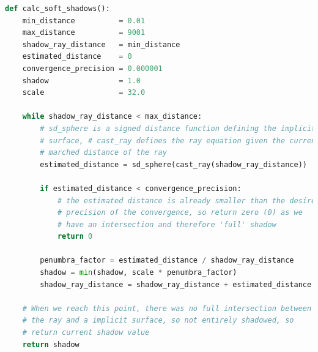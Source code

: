 \begin{lstlisting}[language=Python,caption={Algorithmus zur Berechnung
        von weichen Schatten.},label={alg:sphere_tracing_soft_shadows},captionpos=b,emph={calc_soft_shadows}]
def calc_soft_shadows():
    min_distance          = 0.01
    max_distance          = 9001
    shadow_ray_distance   = min_distance
    estimated_distance    = 0
    convergence_precision = 0.000001
    shadow                = 1.0
    scale                 = 32.0

    while shadow_ray_distance < max_distance:
        # sd_sphere is a signed distance function defining the implicit
        # surface, # cast_ray defines the ray equation given the current travelled /
        # marched distance of the ray
        estimated_distance = sd_sphere(cast_ray(shadow_ray_distance))

        if estimated_distance < convergence_precision:
            # the estimated distance is already smaller than the desired
            # precision of the convergence, so return zero (0) as we
            # have an intersection and therefore 'full' shadow
            return 0

        penumbra_factor = estimated_distance / shadow_ray_distance
        shadow = min(shadow, scale * penumbra_factor)
        shadow_ray_distance = shadow_ray_distance + estimated_distance

    # When we reach this point, there was no full intersection between
    # the ray and a implicit surface, so not entirely shadowed, so
    # return current shadow value
    return shadow
\end{lstlisting}
